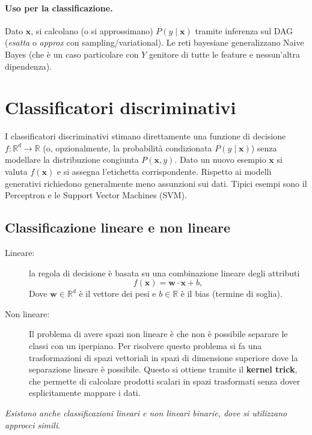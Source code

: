 \paragraph{Uso per la classificazione.}
Dato $\mathbf{x}$, si calcolano (o si approssimano) $P(y\mid \mathbf{x})$ tramite inferenza sul DAG (\emph{esatta} o \emph{approx} con sampling/variational). Le reti bayesiane generalizzano Naive Bayes (che è un caso particolare con $Y$ genitore di tutte le feature e nessun’altra dipendenza).

\section{Classificatori discriminativi}\label{sec:discriminativi}
I classificatori discriminativi stimano direttamente una funzione di decisione $f:\mathbb{R}^d\to\mathbb{R}$ (o, opzionalmente, la probabilità condizionata $P(y\mid\mathbf{x})$) senza modellare la distribuzione congiunta $P(\mathbf{x},y)$. Dato un nuovo esempio $\mathbf{x}$ si valuta $f(\mathbf{x})$ e si assegna l'etichetta corrispondente. Rispetto ai modelli generativi richiedono generalmente meno assunzioni sui dati. Tipici esempi sono il Perceptron e le Support Vector Machines (SVM).

\subsection{Classificazione lineare e non lineare}\label{subsec:lin-nonlin}

\begin{description}
  \item[Lineare:] la regola di decisione è basata su una combinazione lineare degli attributi
  \[
  f(\mathbf{x})=\mathbf{w}\cdot\mathbf{x}+b,
  \]
  Dove $\mathbf{w}\in\mathbb{R}^d$ è il vettore dei pesi e $b\in\mathbb{R}$ è il bias (termine di soglia). 
  \item[Non lineare:] Il problema di avere spazi non lineare è che non è possibile separare le classi con un iperpiano. Per risolvere questo problema si fa una trasformazioni di spazi vettoriali in spazi di dimensione superiore dove la separazione lineare è possibile. Questo si ottiene tramite il \textbf{kernel trick}, che permette di calcolare prodotti scalari in spazi trasformati senza dover esplicitamente mappare i dati.
\end{description}

\noindent
\textit{Esistono anche classificazioni lineari e non lineari binarie, dove si utilizzano approcci simili}.

